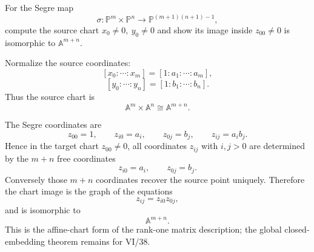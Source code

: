 \begin{problem}\label{prob:vi36-20}
For the Segre map
\[
\sigma:\mathbb P^m\times\mathbb P^n\to\mathbb P^{(m+1)(n+1)-1},
\]
compute the source chart \(x_0\neq0,\ y_0\neq0\) and show its image inside \(z_{00}\neq0\) is isomorphic to
\(\mathbb A^{m+n}\).

\end{problem}

\ifdefined\FullProblemDossiers
\begin{solution}
Normalize the source coordinates:
\[
[x_0:\cdots:x_m]
=
[1:a_1:\cdots:a_m],
\]
\[
[y_0:\cdots:y_n]
=
[1:b_1:\cdots:b_n].
\]
Thus the source chart is
\[
\mathbb A^m\times\mathbb A^n
\cong
\mathbb A^{m+n}.
\]

The Segre coordinates are
\[
z_{00}=1,
\qquad
z_{i0}=a_i,
\qquad
z_{0j}=b_j,
\qquad
z_{ij}=a_i b_j.
\]
Hence in the target chart \(z_{00}\neq0\), all coordinates \(z_{ij}\) with \(i,j>0\) are determined by the
\(m+n\) free coordinates
\[
z_{i0}=a_i,
\qquad
z_{0j}=b_j.
\]
Conversely those \(m+n\) coordinates recover the source point uniquely. Therefore the chart image is the graph of
the equations
\[
z_{ij}=z_{i0}z_{0j},
\]
and is isomorphic to
\[
\boxed{\mathbb A^{m+n}}.
\]
This is the affine-chart form of the rank-one matrix description; the global closed-embedding theorem remains for VI/38.
\end{solution}
\fi
